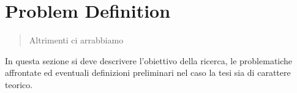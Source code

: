 \chapter{Problem Definition}
\label{chapter3}
\thispagestyle{empty}

\begin{quotation}
{\footnotesize
{}
\begin{flushright}
Altrimenti ci arrabbiamo
\end{flushright}
}
\end{quotation}
\vspace{0.5cm}

\noindent In questa sezione si deve descrivere l'obiettivo della ricerca, le problematiche affrontate ed eventuali definizioni preliminari nel caso la tesi sia di carattere teorico.
